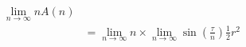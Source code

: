 \documentclass[preview]{standalone}
\begin{document}
\begin{align*}
\lim_{n \to \infty} n A (n) \\ &= \lim_{n \to \infty} n \times \lim_{n \to \infty} \sin \left(\frac {\tau} {n} \right) \frac {1} {2} r^2
\end{align*}
\end{document}
